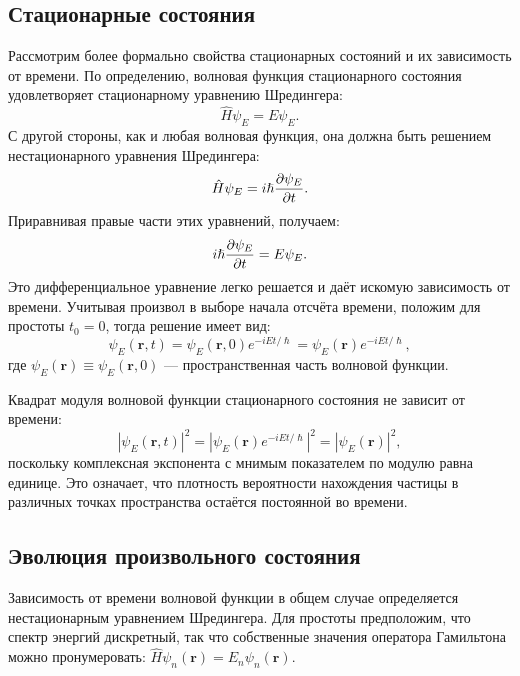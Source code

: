 \documentclass[a4paper, 12pt]{article}
\begin{document}
\subsection{Стационарные состояния}

Рассмотрим более формально свойства стационарных состояний и их зависимость от времени. По определению, волновая функция стационарного состояния удовлетворяет стационарному уравнению Шредингера:
\begin{equation}
\hat{H}\psi_E = E \psi_E.
\end{equation}
С другой стороны, как и любая волновая функция, она должна быть решением нестационарного уравнения Шредингера:
\begin{equation}
\hat{H}\psi_E = i\hslash \pdv{\psi_E}{t}.
\end{equation}
Приравнивая правые части этих уравнений, получаем:
\begin{equation}
i\hslash \pdv{\psi_E}{t} = E \psi_E.
\end{equation}
Это дифференциальное уравнение легко решается и даёт искомую зависимость от времени. Учитывая произвол в выборе начала отсчёта времени, положим для простоты $t_0 = 0$, тогда решение имеет вид:
\begin{equation}
\psi_E(\bm{r}, t) = \psi_E(\bm{r}, 0) e^{-i E t / \hslash} = \psi_E(\bm{r}) e^{-i E t / \hslash},
\end{equation}
где $\psi_E(\bm{r}) \equiv \psi_E(\bm{r}, 0)$ --- пространственная часть волновой функции.

Квадрат модуля волновой функции стационарного состояния не зависит от времени:
\begin{equation}
|\psi_E(\bm{r}, t)|^2 = |\psi_E(\bm{r}) e^{-i E t / \hslash}|^2 = |\psi_E(\bm{r})|^2,
\end{equation}
поскольку комплексная экспонента с мнимым показателем по модулю равна единице. Это означает, что плотность вероятности нахождения частицы в различных точках пространства остаётся постоянной во времени.

\subsection{Эволюция произвольного состояния}

Зависимость от времени волновой функции в общем случае определяется нестационарным уравнением Шредингера. Для простоты предположим, что спектр энергий дискретный, так что собственные значения оператора Гамильтона можно пронумеровать: $\hat{H}\psi_n(\bm{r}) = E_n \psi_n(\bm{r})$.
\end{document}
